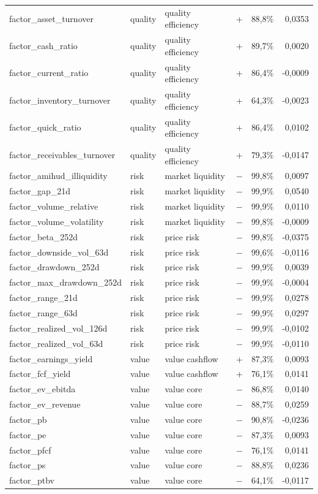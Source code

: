 \begin{longtable}{@{}>{\raggedright\arraybackslash}p{4.9cm}>{\raggedright\arraybackslash}p{1.8cm}>{\raggedright\arraybackslash}p{2.8cm}crr@{}}
factor\_asset\_turnover & quality & quality efficiency & + & 88,8\% & 0,0353 \\
factor\_cash\_ratio & quality & quality efficiency & + & 89,7\% & 0,0020 \\
factor\_current\_ratio & quality & quality efficiency & + & 86,4\% & -0,0009 \\
factor\_inventory\_turnover & quality & quality efficiency & + & 64,3\% & -0,0023 \\
factor\_quick\_ratio & quality & quality efficiency & + & 86,4\% & 0,0102 \\
factor\_receivables\_turnover & quality & quality efficiency & + & 79,3\% & -0,0147 \\
factor\_amihud\_illiquidity & risk & market liquidity & − & 99,8\% & 0,0097 \\
factor\_gap\_21d & risk & market liquidity & − & 99,9\% & 0,0540 \\
factor\_volume\_relative & risk & market liquidity & − & 99,9\% & 0,0110 \\
factor\_volume\_volatility & risk & market liquidity & − & 99,8\% & -0,0009 \\
factor\_beta\_252d & risk & price risk & − & 99,8\% & -0,0375 \\
factor\_downside\_vol\_63d & risk & price risk & − & 99,6\% & -0,0116 \\
factor\_drawdown\_252d & risk & price risk & − & 99,9\% & 0,0039 \\
factor\_max\_drawdown\_252d & risk & price risk & − & 99,9\% & -0,0004 \\
factor\_range\_21d & risk & price risk & − & 99,9\% & 0,0278 \\
factor\_range\_63d & risk & price risk & − & 99,9\% & 0,0297 \\
factor\_realized\_vol\_126d & risk & price risk & − & 99,9\% & -0,0102 \\
factor\_realized\_vol\_63d & risk & price risk & − & 99,9\% & -0,0110 \\
factor\_earnings\_yield & value & value cashflow & + & 87,3\% & 0,0093 \\
factor\_fcf\_yield & value & value cashflow & + & 76,1\% & 0,0141 \\
factor\_ev\_ebitda & value & value core & − & 86,8\% & 0,0140 \\
factor\_ev\_revenue & value & value core & − & 88,7\% & 0,0259 \\
factor\_pb & value & value core & − & 90,8\% & -0,0236 \\
factor\_pe & value & value core & − & 87,3\% & 0,0093 \\
factor\_pfcf & value & value core & − & 76,1\% & 0,0141 \\
factor\_ps & value & value core & − & 88,8\% & 0,0236 \\
factor\_ptbv & value & value core & − & 64,1\% & -0,0117 \\
\end{longtable}
